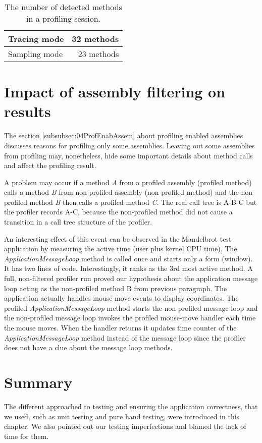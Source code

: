 \begin{table}[h!]
\centering
    \begin{tabular}{|l|r|}
        \hline
        Tracing mode  & 32 methods \\ \hline
        Sampling mode & 23 methods \\
        \hline
    \end{tabular}
     \caption{The number of detected methods in a profiling session. }
    \label{07tbl:compareResultsExactness}
\end{table}

\section{Impact of assembly filtering on results}
The section \ref{subsubsec:04ProfEnabAssem} about profiling enabled assemblies discusses reasons for profiling only some assemblies. Leaving out some assemblies from profiling may, nonetheless, hide some important details about method calls and affect the profiling result. 

A problem may occur if a method \textit{A} from a profiled assembly (profiled method) calls a method \textit{B} from non-profiled assembly (non-profiled method) and the non-profiled method \textit{B} then calls a profiled method \textit{C}. The real call tree is A-B-C but the profiler records A-C, because the non-profiled method did not cause a transition in a call tree structure of the profiler. 

An interesting effect of this event can be observed in the Mandelbrot test application by measuring the active time (user plus kernel CPU time). The \textit{ApplicationMessageLoop} method is called once and starts only a form (window). It has two lines of code. Interestingly, it ranks as the 3rd most active method. A full, non-filtered profiler run proved our hypothesis about the application message loop acting as the non-profiled method B from previous paragraph. The application actually handles mouse-move events to display coordinates. The profiled \textit{ApplicationMessageLoop} method starts the non-profiled message loop and the non-profiled message loop invokes the profiled mouse-move handler each time the mouse moves. When the handler returns it updates time counter of the \textit{ApplicationMessageLoop} method instead of the message loop since the profiler does not have a clue about the message loop methods.

\section{Summary}
The different approached to testing and ensuring the application correctness, that we used, such as unit testing and pure hand testing, were introduced in this chapter. We also pointed out our testing imperfections and blamed the lack of time for them.

